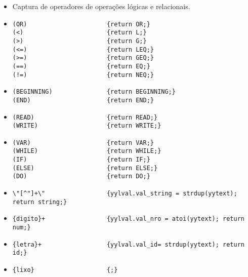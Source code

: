 \begin{itemize}
	\item Captura de operadores de operações lógicas e relacionais.
	\item 
\begin{verbatim}
(OR)                      {return OR;}
(<)                       {return L;}
(>)                       {return G;}
(<=)                      {return LEQ;}
(>=)                      {return GEQ;}
(==)                      {return EQ;}
(!=)                      {return NEQ;}
\end{verbatim}
	\item 
\begin{verbatim}
(BEGINNING)               {return BEGINNING;}
(END)                     {return END;}
\end{verbatim}
	\item 
\begin{verbatim}
(READ)                    {return READ;}
(WRITE)                   {return WRITE;}
\end{verbatim}
	\item 
\begin{verbatim}
(VAR)                     {return VAR;}
(WHILE)                   {return WHILE;}
(IF)                      {return IF;}
(ELSE)                    {return ELSE;}
(DO)                      {return DO;}
\end{verbatim}
	\item 
\begin{verbatim}
\"[^"]+\"                 {yylval.val_string = strdup(yytext); return string;}
\end{verbatim}
	\item 
\begin{verbatim}
{digito}+                 {yylval.val_nro = atoi(yytext); return num;}
\end{verbatim}
	\item 
\begin{verbatim}
{letra}+                  {yylval.val_id= strdup(yytext); return id;}
\end{verbatim}
	\item 
\begin{verbatim}
{lixo}                    {;}
\end{verbatim}
\end{itemize}

















